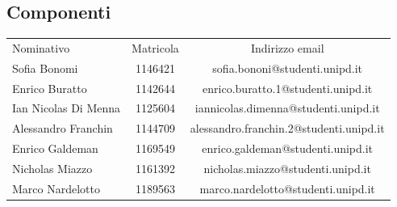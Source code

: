 \documentclass[../piano-di-progetto.tex]{subfiles}
\begin{document}
  \subsection{Componenti}
  \begin{table}[H]
    \centering
    \begin{tabular}{lcc}
      Nominativo & Matricola & Indirizzo email \\
      Sofia Bonomi & 1146421 & sofia.bononi@studenti.unipd.it              \\
      Enrico Buratto & 1142644 & enrico.buratto.1@studenti.unipd.it               \\
      Ian Nicolas Di Menna & 1125604 & iannicolas.dimenna@studenti.unipd.it             \\
      Alessandro Franchin & 1144709 & alessandro.franchin.2@studenti.unipd.it               \\
      Enrico Galdeman & 1169549 & enrico.galdeman@studenti.unipd.it               \\
      Nicholas Miazzo & 1161392 & nicholas.miazzo@studenti.unipd.it               \\
      Marco Nardelotto & 1189563 & marco.nardelotto@studenti.unipd.it
    \end{tabular}
  \end{table}
\end{document}
